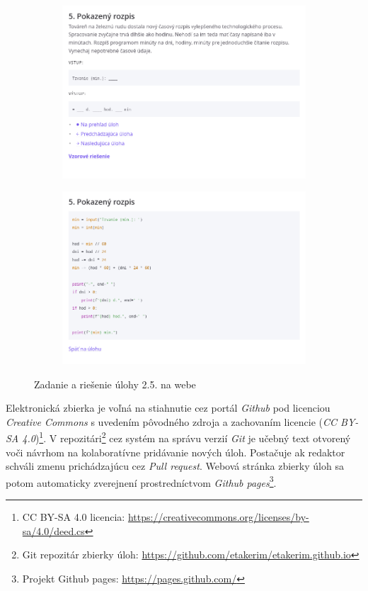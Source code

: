 \begin{figure}[h]
\centering
\begin{subfigure}[b]{0.49\textwidth}
\centering
\includegraphics[width=\textwidth]{assets/web-uloha.png}
\end{subfigure}
\hfill
\begin{subfigure}[b]{0.49\textwidth}
\centering
\includegraphics[width=\textwidth]{assets/web-riesenie.png}
\end{subfigure}
\caption{Zadanie a riešenie úlohy 2.5. na webe}
\label{fig:uloha-online}
\end{figure}

Elektronická zbierka je voľná na stiahnutie cez portál \emph{Github} pod licenciou \emph{Creative Commons} s uvedením pôvodného zdroja a zachovaním licencie (\emph{CC BY-SA 4.0})\footnote{CC BY-SA 4.0 licencia: \url{https://creativecommons.org/licenses/by-sa/4.0/deed.cs}}. V repozitári\footnote{Git repozitár zbierky úloh: \url{https://github.com/etakerim/etakerim.github.io}} cez systém na správu verzií \emph{Git} je učebný text otvorený voči návrhom na kolaboratívne pridávanie nových úloh. Postačuje ak redaktor schváli zmenu prichádzajúcu cez \emph{Pull request}. Webová stránka zbierky úloh sa potom automaticky zverejnení prostredníctvom \emph{Github pages}\footnote{Projekt Github pages: \url{https://pages.github.com/}}.

